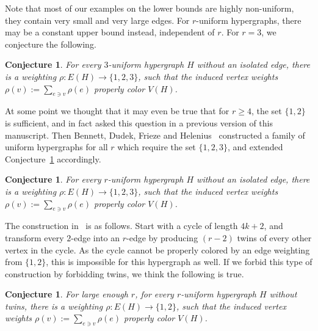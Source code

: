\documentclass[reqno,12pt,epsf]{amsart}
\newtheorem{conjecture}[theorem]{Conjecture}
\def\omm{\rho}
\begin{document}
Note that most of our examples on the lower bounds are highly non-uniform, they contain very small and very large edges. 
For $r$-uniform hypergraphs, there may be a constant upper bound instead, independent of $r$. For $r=3$, we conjecture the following.
\begin{conjecture}\label{con3}
For every $3$-uniform hypergraph $H$ without an isolated edge, there is a weighting $\omm: E(H)\to \{1,2,3\}$,
such that the induced vertex weights $\omm(v):=\sum_{e\ni v}\omm(e)$ properly color $V(H)$.
\end{conjecture}
At some point we thought that it may even be true that for $r\ge 4$, the set $\{1,2\}$ is sufficient, and in fact asked this question in a previous version of this manuscript. 
Then Bennett, Dudek, Frieze and Helenius~\cite{BenDFH} constructed a family of  uniform hypergraphs for all $r$ which require the set $\{1,2,3\}$, and extended Conjecture~\ref{con3} accordingly. 
\begin{conjecture}\cite{BenDFH}
For every $r$-uniform hypergraph $H$ without an isolated edge, there is a weighting $\omm: E(H)\to \{1,2,3\}$,
such that the induced vertex weights $\omm(v):=\sum_{e\ni v}\omm(e)$ properly color $V(H)$.
\end{conjecture}
The construction in~\cite{BenDFH} is as follows. Start with a cycle of length $4k+2$, and transform every $2$-edge into an $r$-edge by producing $(r-2)$ twins of every other vertex in the cycle. As the cycle cannot be properly colored by an edge weighting from $\{1,2\}$, this is impossible for this hypergraph as well. If we forbid this type of construction by forbidding twins, we think the following is true.
\begin{conjecture}
For large enough $r$, for every $r$-uniform hypergraph $H$ without twins, there is a weighting $\omm: E(H)\to \{1,2\}$,
such that the induced vertex weights $\omm(v):=\sum_{e\ni v}\omm(e)$ properly color $V(H)$.
\end{conjecture}



%
\end{document}
